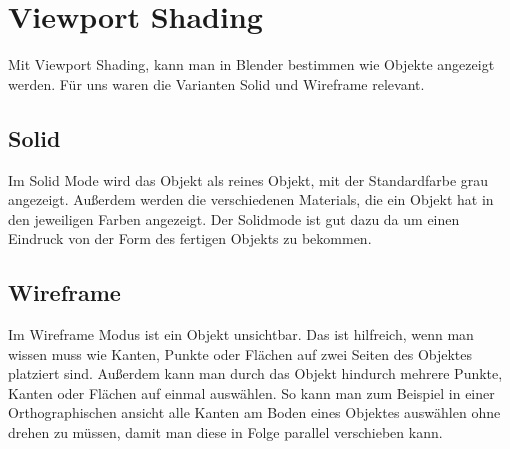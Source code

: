 \section{Viewport Shading}
Mit Viewport Shading, kann man in Blender bestimmen wie Objekte angezeigt werden. Für uns waren die Varianten Solid und Wireframe relevant.

\subsection{Solid}
Im Solid Mode wird das Objekt als reines Objekt, mit der Standardfarbe grau angezeigt. Außerdem werden die verschiedenen Materials, die ein Objekt
hat in den jeweiligen Farben angezeigt. Der Solidmode ist gut dazu da um einen Eindruck von der Form des fertigen Objekts zu bekommen.

\subsection{Wireframe}
Im Wireframe Modus ist ein Objekt unsichtbar. Das ist hilfreich, wenn man wissen muss wie Kanten, Punkte oder Flächen auf zwei Seiten des Objektes
platziert sind. Außerdem kann man durch das Objekt hindurch mehrere Punkte, Kanten oder Flächen auf einmal auswählen. So kann man zum Beispiel
in einer Orthographischen ansicht alle Kanten am Boden eines Objektes auswählen ohne drehen zu müssen, damit man diese in Folge parallel verschieben kann.
